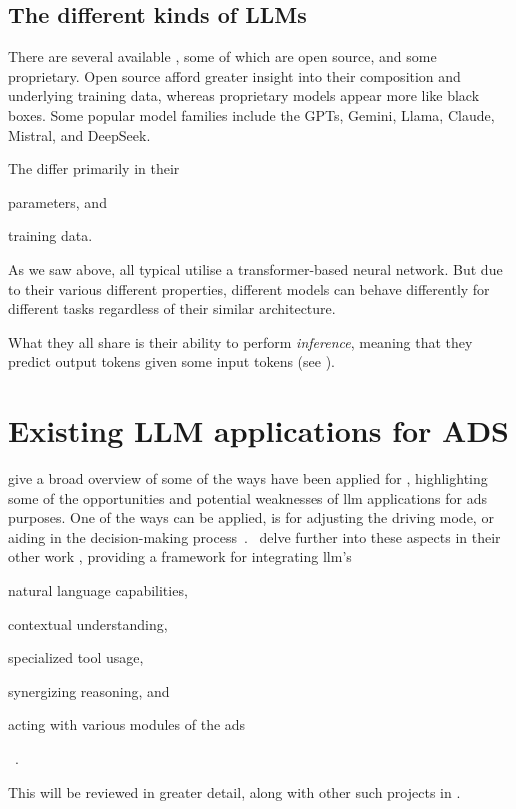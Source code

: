 

\subsection{The different kinds of LLMs}\label{sec:llmJungle}

There are several available , some of which are open source, and some proprietary.
Open source  afford greater insight into their composition and underlying training
data, whereas proprietary models appear more like black boxes. Some popular model families include
the GPTs, Gemini, Llama, Claude, Mistral, and DeepSeek.

The  differ primarily in their \begin{inparaenum}
    \item parameters, and
    \item training data.
\end{inparaenum}
As we saw above, all typical  utilise a transformer-based neural
network. But due to their various different properties, different models can behave differently for
different tasks regardless of their similar architecture.

What they all share is their ability to perform \textit{inference}, meaning that they predict output
tokens given some input tokens (see ).

\section{Existing LLM applications for ADS}\label{sec:llmsForAds}

\citeauthor{LLM4AD} give a broad overview of some of the ways  have been applied for
, highlighting some of the opportunities and potential weaknesses of \acrshort{llm}
applications for \acrshort{ads} purposes. One of the ways  can be applied, is for
adjusting the driving mode, or aiding in the decision-making
process~\cite[1]{LLM4AD}.~\citeauthor{driveAsYouSpeak} delve further into these aspects in their
other work , providing a framework for integrating \acrlong{llm}'s
\begin{inparaenum}
    \item natural language capabilities,
    \item contextual understanding,
    \item specialized tool usage,
    \item synergizing reasoning, and
    \item acting with various modules of the \acrshort{ads}
\end{inparaenum}~\cite[1]{driveAsYouSpeak}.

This will be reviewed in greater detail, along with other such projects in .